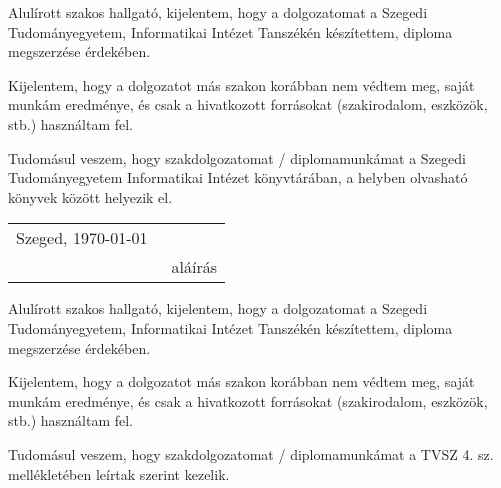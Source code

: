 \documentclass[12pt]{report}
\begin{document}


\noindent
Alulírott \makebox[4cm]{\dotfill} szakos hallgató, kijelentem, hogy a dolgozatomat a Szegedi Tudományegyetem, Informatikai Intézet \makebox[4cm]{\dotfill} Tanszékén készítettem, \makebox[4cm]{\dotfill} diploma megszerzése érdekében.

Kijelentem, hogy a dolgozatot más szakon korábban nem védtem meg, saját munkám eredménye, és csak a hivatkozott forrásokat (szakirodalom, eszközök, stb.) használtam fel.

Tudomásul veszem, hogy szakdolgozatomat / diplomamunkámat a Szegedi Tudományegyetem Informatikai Intézet könyvtárában, a helyben olvasható könyvek között helyezik el.

\vspace*{2cm}

\begin{tabular}{lc}
	Szeged, \today\
	\hspace{2cm} & \makebox[6cm]{\dotfill} \\
	& aláírás \\
\end{tabular}

\vspace*{4cm}


\noindent
Alulírott \makebox[4cm]{\dotfill} szakos hallgató, kijelentem, hogy a dolgozatomat a Szegedi Tudományegyetem, Informatikai Intézet \makebox[4cm]{\dotfill} Tanszékén készítettem, \makebox[4cm]{\dotfill} diploma megszerzése érdekében.

Kijelentem, hogy a dolgozatot más szakon korábban nem védtem meg, saját munkám eredménye, és csak a hivatkozott forrásokat (szakirodalom, eszközök, stb.) használtam fel.

Tudomásul veszem, hogy szakdolgozatomat / diplomamunkámat a TVSZ 4. sz. mellékletében leírtak szerint kezelik.

\vspace*{2cm}
\end{document}
